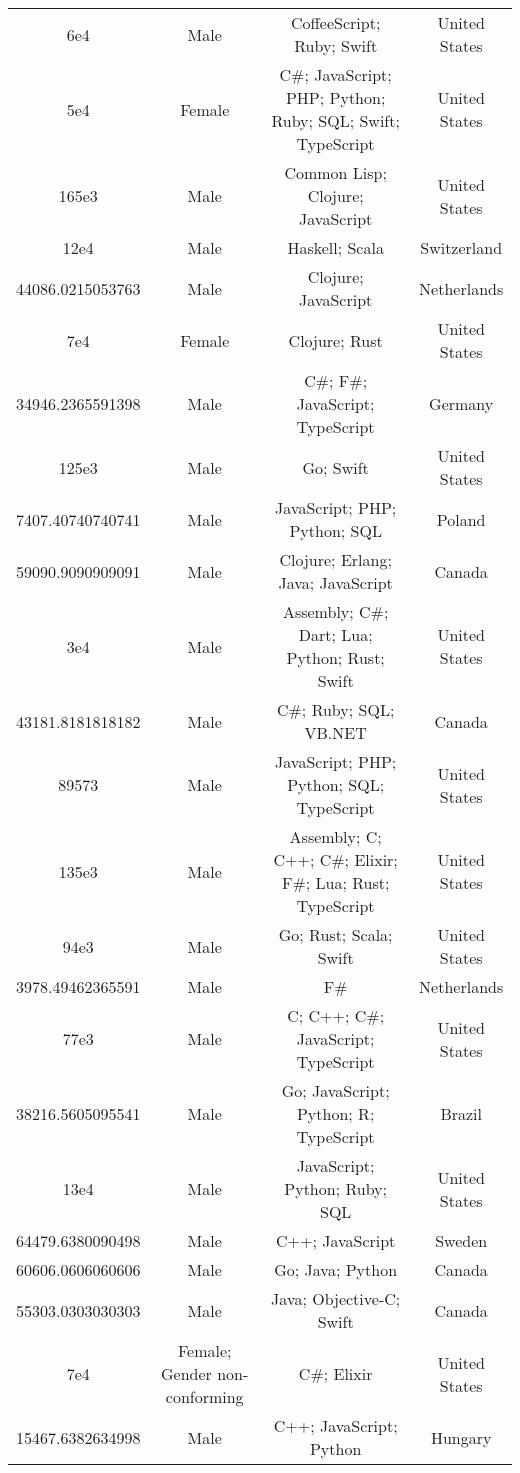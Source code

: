 \begin{center}
\begin{tabular}{ |c|c|c|c| }
6e4  &  Male  &  CoffeeScript; Ruby; Swift  &  United States  \\ 
5e4  &  Female  &  C\#; JavaScript; PHP; Python; Ruby; SQL; Swift; TypeScript  &  United States  \\ 
165e3  &  Male  &  Common Lisp; Clojure; JavaScript  &  United States  \\ 
12e4  &  Male  &  Haskell; Scala  &  Switzerland  \\ 
44086.0215053763  &  Male  &  Clojure; JavaScript  &  Netherlands  \\ 
7e4  &  Female  &  Clojure; Rust  &  United States  \\ 
34946.2365591398  &  Male  &  C\#; F\#; JavaScript; TypeScript  &  Germany  \\ 
125e3  &  Male  &  Go; Swift  &  United States  \\ 
7407.40740740741  &  Male  &  JavaScript; PHP; Python; SQL  &  Poland  \\ 
59090.9090909091  &  Male  &  Clojure; Erlang; Java; JavaScript  &  Canada  \\ 
3e4  &  Male  &  Assembly; C\#; Dart; Lua; Python; Rust; Swift  &  United States  \\ 
43181.8181818182  &  Male  &  C\#; Ruby; SQL; VB.NET  &  Canada  \\ 
89573  &  Male  &  JavaScript; PHP; Python; SQL; TypeScript  &  United States  \\ 
135e3  &  Male  &  Assembly; C; C++; C\#; Elixir; F\#; Lua; Rust; TypeScript  &  United States  \\ 
94e3  &  Male  &  Go; Rust; Scala; Swift  &  United States  \\ 
3978.49462365591  &  Male  &  F\#  &  Netherlands  \\ 
77e3  &  Male  &  C; C++; C\#; JavaScript; TypeScript  &  United States  \\ 
38216.5605095541  &  Male  &  Go; JavaScript; Python; R; TypeScript  &  Brazil  \\ 
13e4  &  Male  &  JavaScript; Python; Ruby; SQL  &  United States  \\ 
64479.6380090498  &  Male  &  C++; JavaScript  &  Sweden  \\ 
60606.0606060606  &  Male  &  Go; Java; Python  &  Canada  \\ 
55303.0303030303  &  Male  &  Java; Objective-C; Swift  &  Canada  \\ 
7e4  &  Female; Gender non-conforming  &  C\#; Elixir  &  United States  \\ 
15467.6382634998  &  Male  &  C++; JavaScript; Python  &  Hungary  \\ 

\end{tabular}
\end{center}
